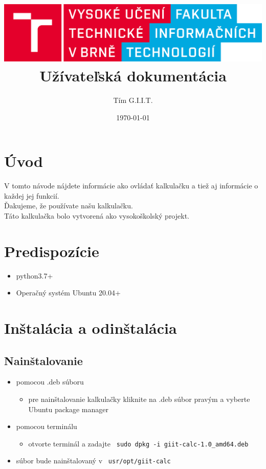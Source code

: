 \documentclass[a4paper, 11pt]{article}
\title{\includegraphics[scale=0.1,keepaspectratio]{pics/logo_cz.eps}\\Užívateľská dokumentácia}
\author{Tím G.I.I.T.}
\date{\today}
\begin{document}
	\maketitle
	\tableofcontents
	\newpage
	
    \section{Úvod}
    V tomto návode nájdete informácie ako ovládať kalkulačku a tiež aj informácie o každej jej funkcií.\\
    Ďakujeme, že používate našu kalkulačku. \\
    Táto kalkulačka bolo vytvorená ako vysokoškolský projekt. 
    \section{Predispozície}
    \begin{itemize}
        \item python3.7+
        \item Operačný systém Ubuntu 20.04+
    \end{itemize}
    \section{Inštalácia a odinštalácia}
    \subsection{Nainštalovanie}
    \begin{itemize}
        \item pomocou .deb súboru
        \begin{itemize}
            \item pre nainštalovanie kalkulačky kliknite na .deb súbor pravým a vyberte Ubuntu package manager
        \end{itemize}
        \item pomocou terminálu
        \begin{itemize}
            \item otvorte terminál a zadajte \texttt{ sudo dpkg -i giit-calc-1.0\_amd64.deb }
        \end{itemize}
        \item súbor bude nainštalovaný v \texttt{ usr/opt/giit-calc }
    \end{itemize}
\end{document}
